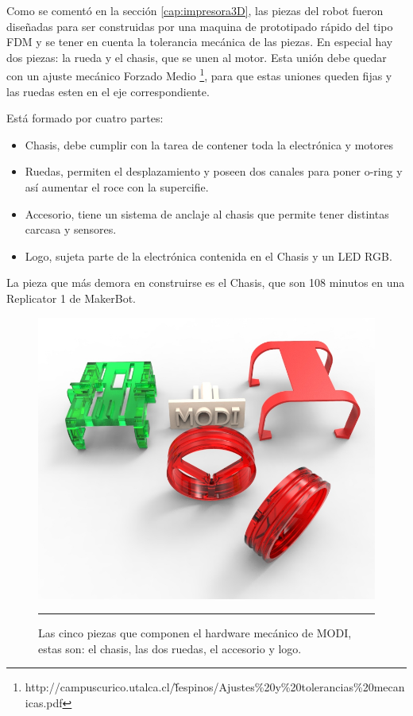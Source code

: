 Como se comentó en la sección \ref{cap:impresora3D}, las piezas del robot fueron diseñadas para ser construidas por una maquina de prototipado rápido del tipo FDM y se tener en cuenta la tolerancia mecánica de las piezas. En especial hay dos piezas: la rueda y el chasis, que se unen al motor. Esta unión debe quedar con un ajuste mecánico Forzado Medio \footnote{http://campuscurico.utalca.cl/\~ fespinos/Ajustes\%20y\%20tolerancias\%20mecanicas.pdf}, para que estas uniones queden fijas y las ruedas esten en el eje correspondiente.

Está formado por cuatro partes:


\begin{itemize}
\item Chasis, debe cumplir con la tarea de contener toda la electrónica y motores
\item Ruedas, permiten el desplazamiento y poseen dos canales para poner o-ring y así aumentar el roce con la supercifie.
\item Accesorio, tiene un sistema de anclaje al chasis que permite tener distintas carcasa y sensores.
\item Logo,  sujeta parte de la electrónica contenida en el Chasis y un LED RGB.
\end{itemize}

La pieza que más demora en construirse es el Chasis, que son 108 minutos en una Replicator 1 de MakerBot.

\begin{figure}[htbp]
	\centering
		\includegraphics[width=\textwidth]{./Figures/MODI/piezas.jpg}
		\rule{35em}{0.5pt}
	\caption[Piezas 3D]{Las cinco piezas que componen el hardware mecánico de MODI, estas son: el chasis, las dos ruedas, el accesorio y logo.}
	\label{fig:Render Piezas 3D}
\end{figure}


